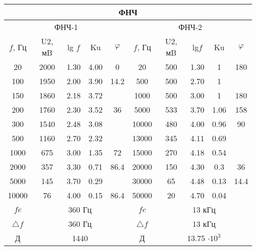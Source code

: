 \documentclass[a4paper,14pt]{extreport}
\begin{document}
\begin{table}[h!]%
	\begin{center}
		\begin{small}
			\begin{tabular}{|c|c|c|c|c|c|c|c|c|c|}
			\hline
			\multicolumn{10}{|c|}{ФНЧ}             \\ \hline
			\multicolumn{5}{|c|}{ФНЧ-1} & \multicolumn{5}{c|}{ФНЧ-2}       \\ \hline
			$f$, Гц  & U2, мB & lg $f$ & Ku           & $\varphi$           & $f$, Гц & U2, мB & lg$ f$ & Ku   & $\varphi$     \\ \hline
			20     & 2000   & 1.30 & 4.00         & 0           & 20    & 500    & 1.30 & 1    & 180   \\ \hline
			100    & 1950   & 2.00 & 3.90         & 14.2        & 500   & 500    & 2.70 & 1    &       \\ \hline
			150    & 1860   & 2.18 & 3.72         &             & 1000  & 500    & 3.00 & 1    & 180   \\ \hline
			200    & 1760   & 2.30 & 3.52         & 36          & 5000  & 533    & 3.70 & 1.06 & 158   \\ \hline
			300    & 1540   & 2.48 & 3.08         &             & 10000 & 480    & 4.00 & 0.96 & 90    \\ \hline
			500    & 1160   & 2.70 & 2.32         &             & 13000 & 345    & 4.11 & 0.69 &       \\ \hline
			1000   & 675    & 3.00 & 1.35         & 72          & 15000 & 270    & 4.18 & 0.54 &       \\ \hline
			2000   & 357    & 3.30 & 0.71         & 86.4        & 20000 & 150    & 4.30 & 0.3  & 36    \\ \hline
			5000   & 145    & 3.70 & 0.29         &             & 30000 & 65     & 4.48 & 0.13 & 14.4  \\ \hline
			10000  & 76     & 4.00 & 0.15         & 86.4        & 50000 & 20     & 4.70 & 0.04 &       \\ \hline
			$fc$  & \multicolumn{4}{c|}{360 Гц}     & $fc $			& \multicolumn{4}{c|}{13 кГц}          \\ \hline
			$\triangle f$ & \multicolumn{4}{c|}{360 Гц} & $\triangle f$ & \multicolumn{4}{c|}{13 кГц}		   \\ \hline
			Д & \multicolumn{4}{c|}{1440}& Д & \multicolumn{4}{c|}{13.75 $\cdot 10^3$} \\ \hline
			\end{tabular}
		\end{small}
	\end{center}
\end{table}
\end{document}
